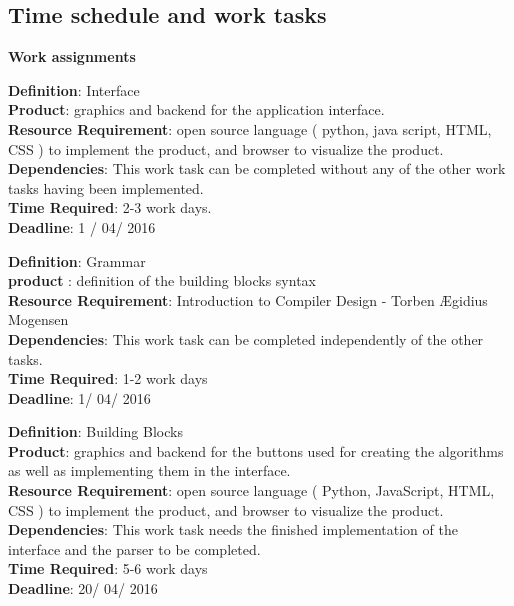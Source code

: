 \documentclass[11pt]{article}
\begin{document}
\iffalse

\subsection{Time schedule and work tasks}
\noindent\makebox[\linewidth]{\rule{\paperwidth}{0.4pt}}
\begin{center}\textbf{Work assignments}\end{center}
\noindent\makebox[\linewidth]{\rule{\paperwidth}{0.4pt}}

\noindent\textbf{Definition}: Interface\\
\textbf{Product}: graphics and backend for the application interface.\\
\textbf{Resource Requirement}: open source language ( python, java script, HTML, CSS ) to implement the product, and browser to visualize the product. \\
\textbf{Dependencies}: This work task can be completed without any of the other work tasks having been implemented.\\
\textbf{Time Required}: 2-3 work days.\\
\textbf{Deadline}: 1 / 04/ 2016\\
\noindent\makebox[\linewidth]{\rule{\paperwidth}{0.4pt}}

\noindent\textbf{Definition}:  Grammar \\
\textbf{product} : definition of the building blocks syntax\\
\textbf{Resource Requirement}: Introduction to Compiler Design - Torben Ægidius Mogensen \citep*{mogensen2011introduction}\\
\textbf{Dependencies}: This work task can be completed independently of the other tasks.\\
\textbf{Time Required}: 1-2 work days\\
\textbf{Deadline}: 1/ 04/ 2016\\
\noindent\makebox[\linewidth]{\rule{\paperwidth}{0.4pt}}

\noindent\textbf{Definition}: Building Blocks \\
\textbf{Product}: graphics and backend for the buttons used for creating the algorithms as well as implementing them in the interface.\\
\textbf{Resource Requirement}: open source language ( Python, JavaScript, HTML, CSS ) to implement the product, and browser to visualize the product. \\
\textbf{Dependencies}: This work task needs the finished implementation of the interface and the parser to be completed.\\
\textbf{Time Required}: 5-6 work days\\
\textbf{Deadline}: 20/ 04/ 2016\\
\noindent\makebox[\linewidth]{\rule{\paperwidth}{0.4pt}}
\end{document}
